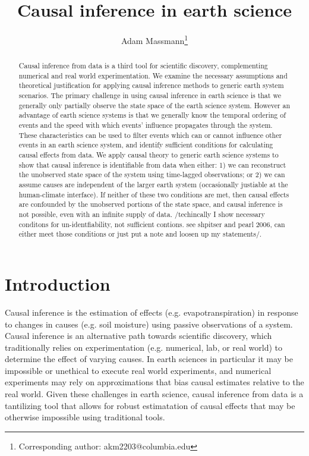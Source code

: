 \documentclass[12pt]{article}
\begin{document}
\title{Causal inference in earth science}

\author{Adam Massmann\thanks{Corresponding author: akm2203@columbia.edu}}

\maketitle

\begin{abstract}
  Causal inference from data is a third tool for scientific discovery,
  complementing numerical and real world experimentation. We examine
  the necessary assumptions and theoretical justification for applying
  causal inference methods to generic earth system scenarios. The
  primary challenge in using causal inference in earth science is that
  we generally only partially observe the state space of the earth
  science system. However an advantage of earth science systems is
  that we generally know the temporal ordering of events and the speed
  with which events' influence propagates through the system. These
  characteristics can be used to filter events which can or cannot
  influence other events in an earth science system, and identify
  sufficient conditions for calculating causal effects from data. We
  apply causal theory to generic earth science systems to show that
  causal inference is identifiable from data when either: 1) we can
  reconstruct the unobserved state space of the system using
  time-lagged observations; or 2) we can assume causes are independent
  of the larger earth system (occasionally justiable at the
  human-climate interface). If neither of these two conditions are
  met, then causal effects are confounded by the unobserved portions
  of the state space, and causal inference is not possible, even with
  an infinite supply of data. /techincally I show necessary conditons
  for un-identfiability, not sufficient contions. see shpitser and
  pearl 2006, can either meet those conditions or just put a note and
  loosen up my statements/.
\end{abstract}

\section{Introduction}


Causal inference is the estimation of effects
(e.g. evapotranspiration) in response to changes in causes (e.g. soil
moisture) using passive observations of a system. Causal inference is
an alternative path towards scientific discovery, which traditionally
relies on experimentation (e.g. numerical, lab, or real world) to
determine the effect of varying causes. In earth sciences in
particular it may be impossible or unethical to execute real world
experiments, and numerical experiments may rely on approximations that
bias causal estimates relative to the real world. Given these
challenges in earth science, causal inference from data is a
tantilizing tool that allows for robust estimatation of causal effects
that may be otherwise impossible using traditional tools.
\end{document}
